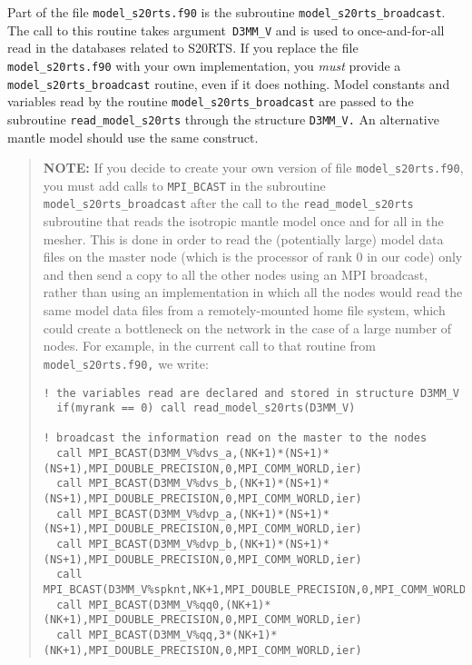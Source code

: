 Part of the file \texttt{model\_s20rts.f90} is the subroutine
\texttt{model\_s20rts\_broadcast}.
The call to this routine takes argument\texttt{ D3MM\_V} and is used
to once-and-for-all read in the databases related to S20RTS. If you
replace the file \texttt{model\_s20rts.f90} with your own implementation,
you \textit{must} provide a \texttt{model\_s20rts\_broadcast} routine,
even if it does nothing. Model constants and variables read by the
routine \texttt{model\_s20rts\_broadcast} are passed to the subroutine
\texttt{read\_model\_s20rts} through the structure \texttt{D3MM\_V.}
An alternative mantle model should use the same construct.

\begin{quote}
\textbf{NOTE:} If you decide to create your own version of file \texttt{model\_s20rts.f90},
you must add calls to \texttt{MPI\_BCAST} in the subroutine \texttt{model\_s20rts\_broadcast}
after the call to the \texttt{read\_model\_s20rts} subroutine that
reads the isotropic mantle model once and for all in the mesher. This
is done in order to read the (potentially large) model data files
on the master node (which is the processor of rank 0 in our code)
only and then send a copy to all the other nodes using an MPI broadcast,
rather than using an implementation in which all the nodes would read
the same model data files from a remotely-mounted home file system,
which could create a bottleneck on the network in the case of a large
number of nodes. For example, in the current call to that routine
from \texttt{model\_s20rts.f90,} we write:

{\footnotesize
\begin{verbatim}
! the variables read are declared and stored in structure D3MM_V
  if(myrank == 0) call read_model_s20rts(D3MM_V)

! broadcast the information read on the master to the nodes
  call MPI_BCAST(D3MM_V%dvs_a,(NK+1)*(NS+1)*(NS+1),MPI_DOUBLE_PRECISION,0,MPI_COMM_WORLD,ier)
  call MPI_BCAST(D3MM_V%dvs_b,(NK+1)*(NS+1)*(NS+1),MPI_DOUBLE_PRECISION,0,MPI_COMM_WORLD,ier)
  call MPI_BCAST(D3MM_V%dvp_a,(NK+1)*(NS+1)*(NS+1),MPI_DOUBLE_PRECISION,0,MPI_COMM_WORLD,ier)
  call MPI_BCAST(D3MM_V%dvp_b,(NK+1)*(NS+1)*(NS+1),MPI_DOUBLE_PRECISION,0,MPI_COMM_WORLD,ier)
  call MPI_BCAST(D3MM_V%spknt,NK+1,MPI_DOUBLE_PRECISION,0,MPI_COMM_WORLD,ier)
  call MPI_BCAST(D3MM_V%qq0,(NK+1)*(NK+1),MPI_DOUBLE_PRECISION,0,MPI_COMM_WORLD,ier)
  call MPI_BCAST(D3MM_V%qq,3*(NK+1)*(NK+1),MPI_DOUBLE_PRECISION,0,MPI_COMM_WORLD,ier)
\end{verbatim}
}
\end{quote}


